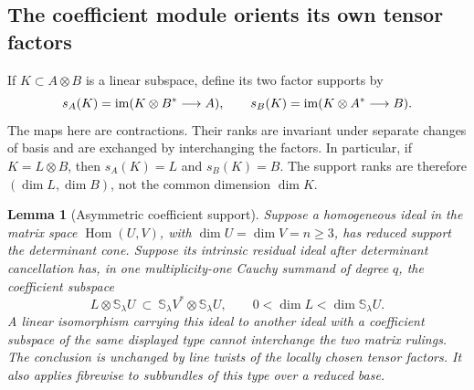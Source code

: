 \documentclass[11pt,reqno]{amsart}
\numberwithin{equation}{section}
\newtheorem{lemma}[theorem]{Lemma}
\theoremstyle{definition}\newtheorem{definition}[theorem]{Definition}
\theoremstyle{remark}\newtheorem{remark}[theorem]{Remark}
\DeclareMathOperator{\Hom}{Hom}\DeclareMathOperator{\Tot}{Tot}
\begin{document}
\subsection{The coefficient module orients its own tensor factors}
If \(K\subset A\otimes B\) is a linear subspace, define its two
factor supports by
\[
 s_A(K)=\operatorname{im}(K\otimes B^*\longrightarrow A),\qquad
 s_B(K)=\operatorname{im}(K\otimes A^*\longrightarrow B).
\]
The maps here are contractions.  Their ranks are invariant under
separate changes of basis and are exchanged by interchanging the
factors.  In particular, if \(K=L\otimes B\), then
\(s_A(K)=L\) and \(s_B(K)=B\).  The support ranks are therefore
\((\dim L,\dim B)\), not the common dimension \(\dim K\).

\begin{lemma}[Asymmetric coefficient support]
\label{lem:coefficient-orientation-v146}
Suppose a homogeneous ideal in the matrix space \(\Hom(U,V)\), with
\(\dim U=\dim V=n\ge3\), has reduced support the determinant cone.
Suppose its intrinsic residual ideal after determinant cancellation
has, in one multiplicity-one Cauchy summand of degree \(q\), the
coefficient subspace
\[
 L\otimes\mathbb S_\lambda U
 \ \subset\ \mathbb S_\lambda V^*\otimes\mathbb S_\lambda U,
 \qquad 0<\dim L<\dim\mathbb S_\lambda U.
\]
A linear isomorphism carrying this ideal to another ideal with a
coefficient subspace of the same displayed type cannot interchange
the two matrix rulings.  The conclusion is unchanged by line twists
of the locally chosen tensor factors.  It also applies fibrewise to
subbundles of this type over a reduced base.
\end{lemma}
\end{document}
